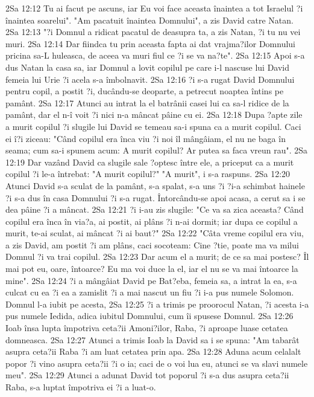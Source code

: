2Sa 12:12  Tu ai facut pe ascuns, iar Eu voi face aceasta înaintea a tot Israelul ?i înaintea soarelui". "Am pacatuit înaintea Domnului", a zis David catre Natan.
2Sa 12:13  "?i Domnul a ridicat pacatul de deasupra ta, a zis Natan, ?i tu nu vei muri.
2Sa 12:14  Dar fiindca tu prin aceasta fapta ai dat vrajma?ilor Domnului pricina sa-L huleasca, de aceea va muri fiul ce ?i se va na?te".
2Sa 12:15  Apoi s-a dus Natan la casa sa, iar Domnul a lovit copilul pe care i-l nascuse lui David femeia lui Urie ?i acela s-a îmbolnavit.
2Sa 12:16  ?i s-a rugat David Domnului pentru copil, a postit ?i, ducându-se deoparte, a petrecut noaptea întins pe pamânt.
2Sa 12:17  Atunci au intrat la el batrânii casei lui ca sa-l ridice de la pamânt, dar el n-î voit ?i nici n-a mâncat pâine cu ei.
2Sa 12:18  Dupa ?apte zile a murit copilul ?i slugile lui David se temeau sa-i spuna ca a murit copilul. Caci ei î?i ziceau: "Când copilul era înca viu ?i noi îl mângâiam, el nu ne baga în seama; cum sa-i spunem acum: A murit copilul? Ar putea sa faca vreun rau".
2Sa 12:19  Dar vazând David ca slugile sale ?optesc între ele, a priceput ca a murit copilul ?i le-a întrebat: "A murit copilul?" "A murit", i s-a raspuns.
2Sa 12:20  Atunci David s-a sculat de la pamânt, s-a spalat, s-a uns ?i ?i-a schimbat hainele ?i s-a dus în casa Domnului ?i s-a rugat. Întorcându-se apoi acasa, a cerut sa i se dea pâine ?i a mâncat.
2Sa 12:21  ?i i-au zis slugile: "Ce va sa zica aceasta? Când copilul era înca în via?a, ai postit, ai plâns ?i n-ai dormit; iar dupa ce copilul a murit, te-ai sculat, ai mâncat ?i ai baut?"
2Sa 12:22  "Câta vreme copilul era viu, a zis David, am postit ?i am plâns, caci socoteam: Cine ?tie, poate ma va milui Domnul ?i va trai copilul.
2Sa 12:23  Dar acum el a murit; de ce sa mai postesc? Îl mai pot eu, oare, întoarce? Eu ma voi duce la el, iar el nu se va mai întoarce la mine".
2Sa 12:24  ?i a mângâiat David pe Bat?eba, femeia sa, a intrat la ea, s-a culcat cu ea ?i ea a zamislit ?i a mai nascut un fiu ?i i-a pus numele Solomon. Domnul l-a iubit pe acesta,
2Sa 12:25  ?i a trimis pe proorocul Natan, ?i acesta i-a pus numele Iedida, adica iubitul Domnului, cum îi spusese Domnul.
2Sa 12:26  Ioab însa lupta împotriva ceta?ii Amoni?ilor, Raba, ?i aproape luase cetatea domneasca.
2Sa 12:27  Atunci a trimis Ioab la David sa i se spuna: "Am tabarât asupra ceta?ii Raba ?i am luat cetatea prin apa.
2Sa 12:28  Aduna acum celalalt popor ?i vino asupra ceta?ii ?i o ia; caci de o voi lua eu, atunci se va slavi numele meu".
2Sa 12:29  Atunci a adunat David tot poporul ?i s-a dus asupra ceta?ii Raba, s-a luptat împotriva ei ?i a luat-o.
